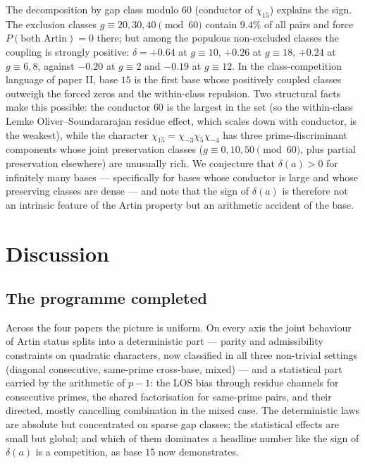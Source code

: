 \documentclass[11pt,reqno]{amsart}
\theoremstyle{plain}
\theoremstyle{definition}
\begin{document}
The decomposition by gap class modulo $60$ (conductor of $\chi_{15}$)
explains the sign. The exclusion classes $g \equiv 20, 30, 40 \pmod{60}$
contain $9.4\%$ of all pairs and force $P(\text{both Artin}) = 0$ there; but
among the populous non-excluded classes the coupling is strongly positive:
$\delta = +0.64$ at $g \equiv 10$, $+0.26$ at $g \equiv 18$, $+0.24$ at
$g \equiv 6, 8$, against $-0.20$ at $g \equiv 2$ and $-0.19$ at
$g \equiv 12$. In the class-competition language of paper II, base $15$ is
the first base whose positively coupled classes outweigh the forced zeros
and the within-class repulsion. Two structural facts make this possible: the
conductor $60$ is the largest in the set (so the within-class
Lemke Oliver--Soundararajan residue effect, which scales down with
conductor, is the weakest), while the character $\chi_{15} = \chi_{-3}
\chi_{5} \chi_{-4}$ has three prime-discriminant components whose joint
preservation classes ($g \equiv 0, 10, 50 \pmod{60}$, plus partial
preservation elsewhere) are unusually rich. We conjecture that
$\delta(a) > 0$ for infinitely many bases --- specifically for bases whose
conductor is large and whose preserving classes are dense --- and note that
the sign of $\delta(a)$ is therefore not an intrinsic feature of the Artin
property but an arithmetic accident of the base.

\section{Discussion}
\label{sec:discussion}

\subsection*{The programme completed}
Across the four papers the picture is uniform. On every axis the joint
behaviour of Artin status splits into a deterministic part --- parity and
admissibility constraints on quadratic characters, now classified in all
three non-trivial settings (diagonal consecutive, same-prime cross-base,
mixed) --- and a statistical part carried by the arithmetic of $p - 1$: the
LOS bias through residue channels for consecutive primes, the shared
factorisation for same-prime pairs, and their directed, mostly cancelling
combination in the mixed case. The deterministic laws are absolute but
concentrated on sparse gap classes; the statistical effects are small but
global; and which of them dominates a headline number like the sign of
$\delta(a)$ is a competition, as base $15$ now demonstrates.
\end{document}
